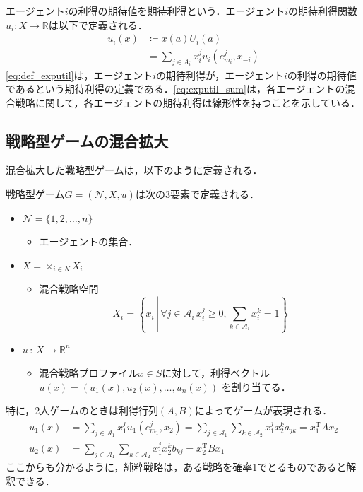 \documentclass{jsreport}
\begin{document}
エージェント$i$の利得の期待値を期待利得という．エージェント$i$の期待利得関数$u_i: X \to \mathbb{R}$は以下で定義される．
\begin{align}
  u_i(x) &\coloneqq x(a)U_i(a) \label{eq:def_exputil} \\
  &= \sum_{j \in A_i} x_i^j u_i(e_{m_i}^j, x_{-i}) \label{eq:exputil_sum}
\end{align}
\eqref{eq:def_exputil}は，エージェント$i$の期待利得が，エージェント$i$の利得の期待値であるという期待利得の定義である．\eqref{eq:exputil_sum}は，各エージェントの混合戦略に関して，各エージェントの期待利得は線形性を持つことを示している．
\subsection{戦略型ゲームの混合拡大}
混合拡大した戦略型ゲームは，以下のように定義される．
\begin{screen}
  \begin{defi}[戦略型ゲーム]
  戦略型ゲーム$G = (\mathcal{N}, X, u)$は次の3要素で定義される．
  \begin{itemize}
    \item $\mathcal{N} = \{1, 2, \ldots, n\}$
    \begin{itemize}
      \item エージェントの集合．
    \end{itemize}
    \item $X = \times_{i \in N} X_i$
    \begin{itemize}
      \item 混合戦略空間
      \begin{equation}
        X_i = \left\{x_i \, \left| \, \forall j \in \mathcal{A}_i \, x_i^j \geq 0, \sum_{k \in \mathcal{A}_i} x_i^k = 1\right.\right\} \nonumber
      \end{equation}
    \end{itemize}
    \item $u \, : \, X \rightarrow \mathbb{R}^n$
    \begin{itemize}
      \item 混合戦略プロファイル$x \in S$に対して，利得ベクトル
      $u(x) = (u_1(x), u_2(x), \ldots, u_n(x))$
      を割り当てる．
    \end{itemize}
  \end{itemize}
  \end{defi}
\end{screen}

特に，2人ゲームのときは利得行列$(A, B)$によってゲームが表現される．
\begin{align}
  u_1(x) &= \sum_{j \in \mathcal{A}_1} x_1^j u_1(e_{m_1}^j, x_2) = \sum_{j \in \mathcal{A}_1} \sum_{k \in \mathcal{A}_2} x_1^j x_2^k a_{jk} = x_1^{\mathrm{T}}Ax_2 \nonumber \\
  u_2(x) &= \sum_{j \in \mathcal{A}_1} \sum_{k \in \mathcal{A}_2} x_1^j x_2^k b_{kj} = x_2^{\mathrm{T}} B x_1 \nonumber
\end{align}
ここからも分かるように，純粋戦略は，ある戦略を確率1でとるものであると解釈できる．
\end{document}
